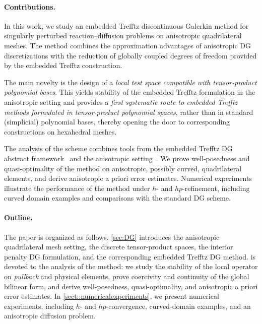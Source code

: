 \documentclass[a4paper,twoside,10pt]{article}
\numberwithin{equation}{section}
\begin{document}
		\paragraph{Contributions.}
		In this work, we study an embedded Trefftz discontinuous Galerkin method for singularly perturbed reaction--diffusion problems on anisotropic quadrilateral meshes.
		The method combines the approximation advantages of anisotropic DG discretizations with the reduction of globally coupled degrees of freedom provided by the embedded Trefftz construction.
		
		The main novelty is the design of a \emph{local test space compatible with tensor-product polynomial bases}.
		This yields stability of the embedded Trefftz formulation in the anisotropic setting   and 
		provides a \emph{first systematic route to embedded Trefftz methods formulated in tensor-product polynomial spaces}, rather than in standard (simplicial) polynomial bases, thereby 
		opening the door to corresponding constructions on hexahedral meshes.
		
		The analysis of the scheme combines tools from the embedded Trefftz DG abstract framework~\cite{LLSV_ARXIV_2024} and the anisotropic setting~\cite{G03dm}.
		We prove well-posedness and quasi-optimality of the method on anisotropic, possibly curved, quadrilateral elements,  and derive anisotropic a priori error estimates. 
		Numerical experiments illustrate the performance of the method under $h$- and $hp$-refinement, including curved domain examples and comparisons with the standard DG scheme.
		\vspace{-2em}
		
		\paragraph{Outline.}
		The paper is organized as follows.
		\cref{sec:DG} 
		introduces the anisotropic quadrilateral mesh setting, the discrete tensor-product spaces, the interior penalty DG formulation, and the corresponding embedded Trefftz DG method.
		 is devoted to the analysis of
		the method: we study the stability of the local operator on \emph{pullback} and physical elements, prove coercivity and continuity of the global bilinear form, and 
		derive well-posedness, quasi-optimality, and anisotropic a priori error estimates.
		In \cref{sect::numericalexperiments}, we present numerical experiments, including 
		$h$- and $hp$-convergence, curved-domain examples, and an anisotropic 
		diffusion problem.
		
\end{document}
